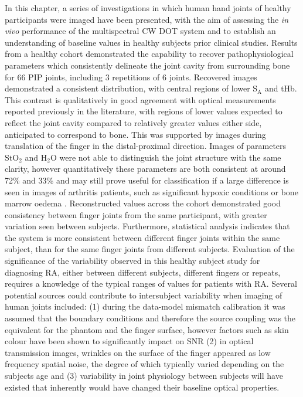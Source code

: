 \documentclass[twoside]{bhamthesis}
\theoremstyle{definition}
\begin{document}
In this chapter, a series of investigations in which human hand joints of healthy participants were imaged have been presented, with the aim of assessing the \textit{in vivo} performance of the multispectral CW DOT system and to establish an understanding of baseline values in healthy subjects prior clinical studies. Results from a healthy cohort demonstrated the capability to recover pathophysiological parameters which consistently delineate the joint cavity from surrounding bone for 66 PIP joints, including 3 repetitions of 6 joints. Recovered images demonstrated a consistent distribution, with central regions of lower $\mathrm{S_A}$ and tHb. This contrast is qualitatively in good agreement with optical measurements reported previously in the literature, with regions of lower values expected to reflect the joint cavity compared to relatively greater values either side, anticipated to correspond to bone. This was supported by images during translation of the finger in the distal-proximal direction. Images of parameters $\mathrm{StO_2}$ and $\mathrm{H_2O}$ were not able to distinguish the joint structure with the same clarity, however quantitatively these parameters are both consistent at around 72\% and 33\% and may still prove useful for classification if a large difference is seen in images of arthritis patients, such as significant hypoxic conditions \cite{ng2010synovial} or bone marrow oedema \cite{sudol2013significance}. Reconstructed values across the cohort demonstrated good consistency between finger joints from the same participant, with greater variation seen between subjects. Furthermore, statistical analysis indicates that the system is more consistent between different finger joints within the same subject, than for the same finger joints from different subjects. Evaluation of the significance of the variability observed in this healthy subject study for diagnosing RA, either between different subjects, different fingers or repeats, requires a knowledge of the typical ranges of values for patients with RA. Several potential sources could contribute to intersubject variability when imaging of human joints included: (1) during the data-model mismatch calibration it was assumed that the boundary conditions and therefore the source coupling was the equivalent for the phantom and the finger surface, however factors such as skin colour have been shown to significantly impact on SNR \cite{zonios2001skin} (2) in optical transmission images, wrinkles on the surface of the finger appeared as low frequency spatial noise, the degree of which typically varied depending on the subjects age and (3) variability in joint physiology between subjects will have existed that inherently would have changed their baseline optical properties.
\end{document}
